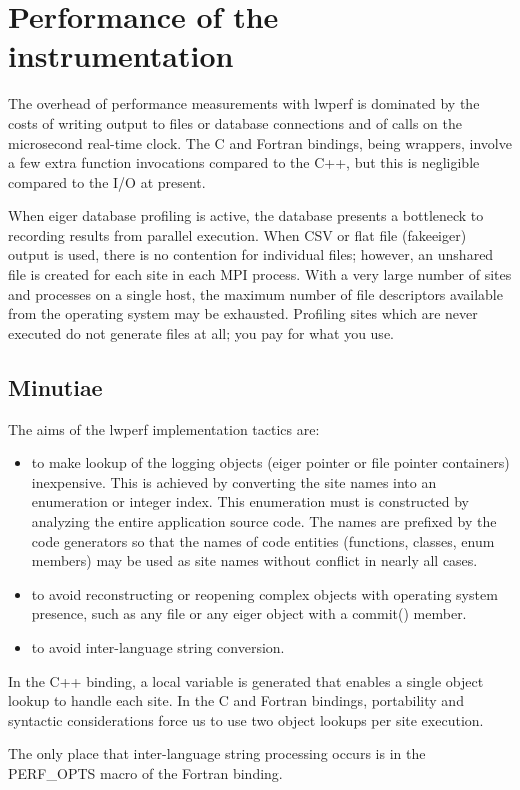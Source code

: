 
\chapter{Performance of the instrumentation}\label{sec:speed}
The overhead of performance measurements with lwperf is dominated by the costs of writing output to files or database connections and of calls on the microsecond real-time clock.
The C and Fortran bindings, being wrappers, involve a few extra function invocations compared to the C++, but this is negligible compared to the I/O at present.

When eiger database profiling is active, the database presents a bottleneck to recording results from parallel execution. When CSV or flat file (fakeeiger) output is used, there is no contention for individual files; however, an unshared file is created for each site in each MPI process. With a very large number of sites and processes on a single host, the maximum number of file descriptors available from the operating system may be exhausted. Profiling sites which are never executed do not generate files at all; you pay for what you use.

\section{Minutiae}
The aims of the lwperf implementation tactics are:
\begin{itemize}
\item to make lookup of the logging objects (eiger pointer or file pointer containers) inexpensive. This is achieved by converting the site names into an enumeration or integer index. This enumeration must is constructed by analyzing the entire application source code. The names are prefixed by the code generators so that the names of code entities (functions, classes, enum members) may be used as site names without conflict in nearly all cases.

\item to avoid reconstructing or reopening complex objects with operating system presence, such as any file or any eiger object with a commit() member.
\item to avoid inter-language string conversion.
\end{itemize}

In the C++ binding, a local variable is generated that enables a single object lookup to handle each site. In the C and Fortran bindings, portability and syntactic considerations force us to use two object lookups per site execution.

The only place that inter-language string processing occurs is in the PERF\_OPTS macro of the Fortran binding.


